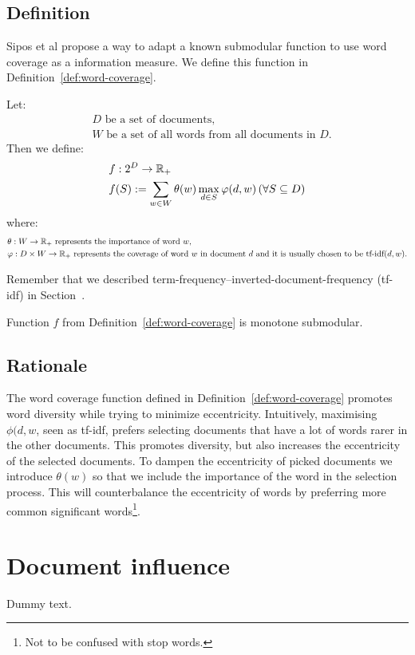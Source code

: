 \subsection{Definition}

Sipos et al \cite{sipos2012temporal} propose a way to adapt a known submodular
function to use word coverage as a information measure. We define this function
in Definition~\ref{def:word-coverage}.
\begin{definition}
  \label{def:word-coverage}
  Let:
  \begin{align*}
    &D \text{ be a set of documents, } \\
    &W \text{ be a set of all words from all documents in \(D\).}
  \end{align*}
  Then we define:
  \begin{align*}
    &f : 2^D \to \mathbb{R}_+ \\
    &f(S) := \sum_{w \in W} \theta(w) \max_{d \in S} \varphi(d, w)
    \,(\forall S \subseteq D)
  \end{align*}
  where:
  \begin{align*}
    &\theta : W \to \mathbb{R}_+ \text{ represents the importance of word \(w\),} \\
    &\varphi : D \times W \to \mathbb{R}_+ \text{ represents the coverage of word \(w\) in
    document \(d\) and it is usually chosen to be tf-idf\((d, w)\).}
  \end{align*}
\end{definition}
Remember that we described term-frequency--inverted-document-frequency
(tf-idf) in Section~.

\begin{proposition}
  Function \(f\) from Definition~\ref{def:word-coverage} is monotone submodular.
\end{proposition}

\subsection{Rationale}

The word coverage function defined in Definition~\vref{def:word-coverage}
promotes word diversity while trying to minimize eccentricity. Intuitively,
maximising \(\phi(d, w\), seen as tf-idf, prefers selecting documents that have
a lot of words rarer in the other documents. This promotes diversity, but also
increases the eccentricity of the selected documents. To dampen the
eccentricity of picked documents we introduce \(\theta(w)\) so that we include
the importance of the word in the selection process. This will counterbalance
the eccentricity of words by preferring more common significant
words\footnote{Not to be confused with stop words.}.

\section{Document influence}
\label{sec:doc-influence}

Dummy text.

